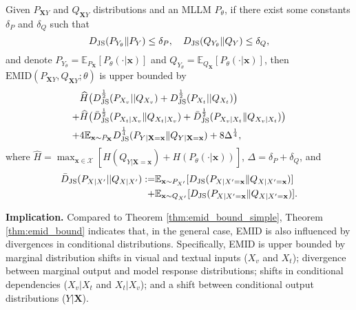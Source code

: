 \vspace{0.2cm}
\begin{theorem}\label{thm:emid_bound}
Given $P_{\mathbf{X}Y}$ and $Q_{\mathbf{X}Y}$ distributions and an MLLM $P_{{\theta}}$, if there exist some constants $\delta_{P}$ and $\delta_{Q}$ such that
\begin{equation*}
    D_{\rm JS}(P_{Y_{{\theta}}}\|P_{Y})\leq \delta_{P},~~~ D_{\rm JS}(Q_{Y_{{\theta}}}\|Q_{Y})\leq \delta_{Q},
\end{equation*}
 and denote $P_{Y_{\theta}}=\mathbb{E}_{P_{\mathbf{X}}} [P_{{\theta}}(\cdot|\mathbf{x})]$ and $Q_{Y_{\theta}}=\mathbb{E}_{Q_{\mathbf{X}}} [P_{{\theta}}(\cdot|\mathbf{x})]$, then $\text{EMID}(P_{\mathbf{X}Y},Q_{\mathbf{X}Y};\theta)$ is upper bounded by
\begin{equation} \label{eq:emid_bound}
    \begin{split}
    & \widehat{H}\big({ D^{\frac{1}{2}}_{\rm JS}(P_{X_{v}}||Q_{X_{v}}) + D^{\frac{1}{2}}_{\rm JS}(P_{X_{t}}||Q_{X_{t}})} \big) \nonumber\\
    +&\widehat{H}\big({\bar{D}^{\frac{1}{2}}_{\rm JS}(P_{X_{t}|X_{v}}\|Q_{X_{t}|X_{v}})+\bar{D}^{\frac{1}{2}}_{\rm JS}(P_{X_{v}|X_{t}}\|Q_{X_{v}|X_{t}})} \big)\nonumber\\
    +&4 \mathbb{E}_{\mathbf{x}\sim P_{\mathbf{X}} } D^{\frac{1}{4}}_{\rm JS}(P_{Y|\mathbf{X}=\mathbf{x}}\|Q_{Y|\mathbf{X}=\mathbf{x}}) + 8\Delta^{\frac{1}{4}},
    \end{split}
\end{equation}
\normalsize
where $ \widehat{H}=\max_{\mathbf{x}\in\mathcal{X}} [H(Q_{Y|\mathbf{X}=\mathbf{x}})+H(P_{\theta}(\cdot|\mathbf{x}))]$, $\Delta=\delta_{P}+\delta_{Q}$, and \begin{equation*}
\begin{split}
    \bar{D}_{\rm JS}(P_{X|X'}||Q_{X|X'}):=&\mathbb{E}_{\mathbf{x}\sim P_{X'}}[D_{\rm JS}(P_{X|{X'}=\mathbf{x}}\|Q_{X|{X'}=\mathbf{x}})]\\+&\mathbb{E}_{\mathbf{x}\sim Q _{X'}}[D_{\rm JS}(P_{X|{X'}=\mathbf{x}}\|Q_{X|{X'}=\mathbf{x}})].
    \end{split}
\end{equation*}
\end{theorem}

\begin{tcolorbox}[width=\linewidth, colback=white!95!black]
\noindent \textbf{Implication.} 
Compared to Theorem \ref{thm:emid_bound_simple}, Theorem \ref{thm:emid_bound} indicates that, in the general case, EMID is also influenced by divergences in conditional distributions. Specifically, EMID is upper bounded by marginal distribution shifts in visual and textual inputs ($X_v$ and $X_t$); divergence between marginal output and model response distributions; shifts in conditional dependencies ($X_v | X_t$ and $X_t | X_v$); and a shift between conditional output distributions ($Y|\mathbf{X}$).
\end{tcolorbox}


